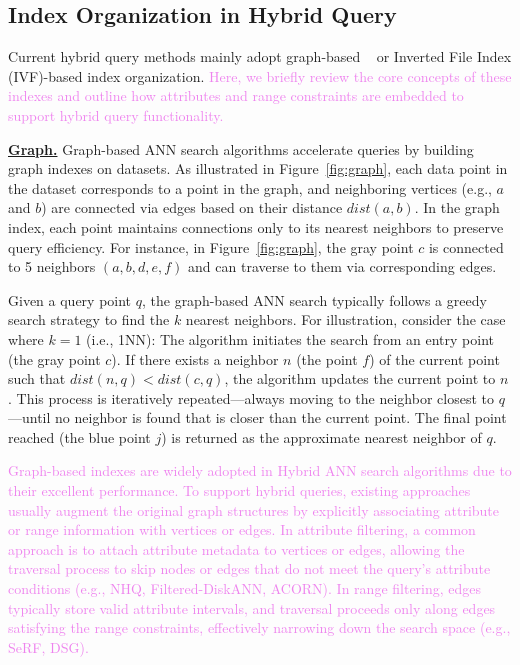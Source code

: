 \documentclass[sigconf, nonacm]{acmart}
\begin{document}
	
	
	\subsection{Index Organization in Hybrid Query}
	
	Current hybrid query methods mainly adopt graph-based ~\cite{nsw,kgraph,nsg,fanng,ngt} or Inverted File Index (IVF)-based \cite{PQ} index organization. 
	\textcolor{violet}{Here, we briefly review the core concepts of these indexes and outline how attributes and range constraints are embedded to support hybrid query functionality.}
	
	\noindent\textbf{\underline{Graph.}}
	Graph-based ANN search algorithms accelerate queries by building graph indexes on datasets. As illustrated in Figure~\ref{fig:graph}, each data point in the dataset corresponds to a point in the graph, and neighboring vertices (e.g., $a$ and $b$) are connected via edges based on their distance $\textit{dist}(a, b)$. In the graph index, each point maintains connections only to its nearest neighbors to preserve query efficiency. For instance, in Figure~\ref{fig:graph}, the gray point $c$ is connected to 5 neighbors $(a, b, d, e, f)$ and can traverse to them via corresponding edges.
	
	Given a query point $q$, the graph-based ANN search typically follows a greedy search strategy to find the $k$ nearest neighbors. For illustration, consider the case where $k = 1$ (i.e., 1NN): The algorithm initiates the search from an entry point (the gray point $c$). If there exists a neighbor $n$ (the point $f$) of the current point such that $\textit{dist}(n, q) < \textit{dist}(c, q)$, the algorithm updates the current point to $n$. This process is iteratively repeated—always moving to the neighbor closest to $q$—until no neighbor is found that is closer than the current point. The final point reached (the blue point $j$) is returned as the approximate nearest neighbor of $q$.
	
	\textcolor{violet}{Graph-based indexes are widely adopted in Hybrid ANN search algorithms due to their excellent performance. To support hybrid queries, existing approaches usually augment the original graph structures by explicitly associating attribute or range information with vertices or edges. In attribute filtering, a common approach is to attach attribute metadata to vertices or edges, allowing the traversal process to skip nodes or edges that do not meet the query's attribute conditions (e.g., NHQ, Filtered-DiskANN, ACORN). In range filtering, edges typically store valid attribute intervals, and traversal proceeds only along edges satisfying the range constraints, effectively narrowing down the search space (e.g., SeRF, DSG).}
	
\end{document}

